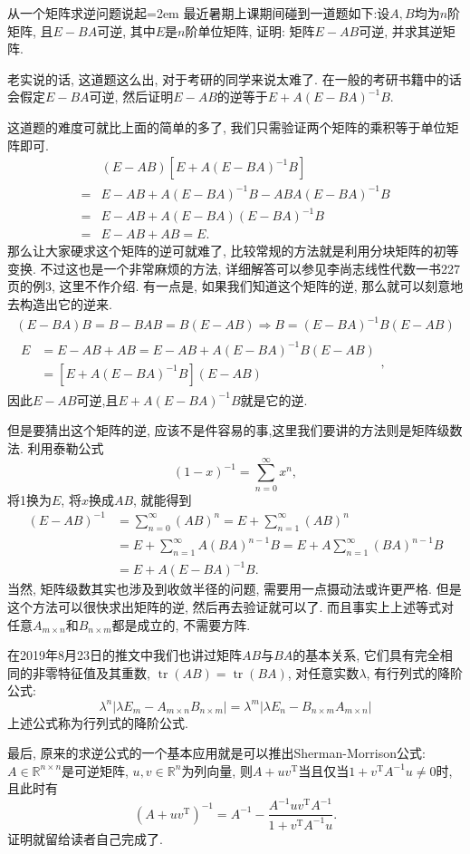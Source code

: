 \documentclass[UTF8,no-math,12pt,openany,table,dvipsnames,svgnames]{book}
\DeclareMathOperator{\tr}{tr}
\begin{document}
\begin{MYBOX}[colbacktitle=blue]{从一个矩阵求逆问题说起}\parindent=2em
最近暑期上课期间碰到一道题如下:设$A,B$均为$n$阶矩阵, 且$E-BA$可逆, 其中$E$是$n$阶单位矩阵, 证明: 矩阵$E-AB$可逆, 并求其逆矩阵.

老实说的话, 这道题这么出, 对于考研的同学来说太难了. 在一般的考研书籍中的话会假定$E-BA$可逆, 然后证明$E-AB$的逆等于$E+A(E-BA)^{-1}B$.

这道题的难度可就比上面的简单的多了, 我们只需验证两个矩阵的乘积等于单位矩阵即可.
\begin{align*}
  &(E-AB)[E+A(E-BA)^{-1}B] \\
  ={}& E-AB+A(E-BA)^{-1}B-ABA(E-BA)^{-1}B\\
  ={}& E-AB+A(E-BA)(E-BA)^{-1}B\\
  ={}& E-AB+AB=E.
\end{align*}
那么让大家硬求这个矩阵的逆可就难了, 比较常规的方法就是利用分块矩阵的初等变换. 不过这也是一个非常麻烦的方法, 详细解答可以参见李尚志线性代数一书227页的例3, 这里不作介绍. 有一点是, 如果我们知道这个矩阵的逆, 那么就可以刻意地去构造出它的逆来.
\begin{gather*}
  (E-BA)B = B - BAB = B(E-AB)\Rightarrow B=(E-BA)^{-1}B(E-AB)\\
  \begin{aligned}
    E& = E-AB+AB = E-AB+A(E-BA)^{-1}B(E-AB)\\
     & = [E+A(E-BA)^{-1}B](E-AB)
  \end{aligned},
\end{gather*}
因此$E-AB$可逆,且$E+A(E-BA)^{-1}B$就是它的逆.

但是要猜出这个矩阵的逆, 应该不是件容易的事,这里我们要讲的方法则是矩阵级数法. 利用泰勒公式
\[
  (1-x)^{-1}=\sum_{n=0}^\infty x^n,
\]
将1换为$E$, 将$x$换成$AB$, 就能得到
\begin{align*}
  (E-AB)^{-1} & = \sum_{n=0}^\infty (AB)^n = E+\sum_{n=1}^\infty(AB)^n\\
  & = E+\sum_{n=1}^\infty A(BA)^{n-1}B = E+A\sum_{n=1}^\infty(BA)^{n-1}B\\
  & = E+A(E-BA)^{-1}B.
\end{align*}
当然, 矩阵级数其实也涉及到收敛半径的问题, 需要用一点摄动法或许更严格. 但是这个方法可以很快求出矩阵的逆, 然后再去验证就可以了. 而且事实上上述等式对任意$A_{m\times n}$和$B_{n\times m}$都是成立的, 不需要方阵.

在2019年8月23日的推文中我们也讲过矩阵$AB$与$BA$的基本关系, 它们具有完全相同的非零特征值及其重数, $\tr(AB)=\tr(BA)$, 对任意实数$\lambda$, 有行列式的降阶公式:
\[
  \lambda^n|\lambda E_m- A_{m\times n}B_{n\times m}|
  = \lambda^m|\lambda E_n-B_{n\times m} A_{m\times n}|
\]
上述公式称为行列式的降阶公式.

最后, 原来的求逆公式的一个基本应用就是可以推出Sherman-Morrison公式: $A\in\mathbb R^{n\times n}$是可逆矩阵, $u,v\in\mathbb R^n$为列向量, 则$A+uv^{\mathrm T}$当且仅当$1+v^{\mathrm T}A^{-1}u\ne0$时, 且此时有
\[
  (A+uv^{\mathrm T})^{-1}= A^{-1} - \frac{A^{-1}uv^{\mathrm T}A^{-1}}{1+v^{\mathrm T}A^{-1}u}.
\]
证明就留给读者自己完成了.
\end{MYBOX}
\end{document}
